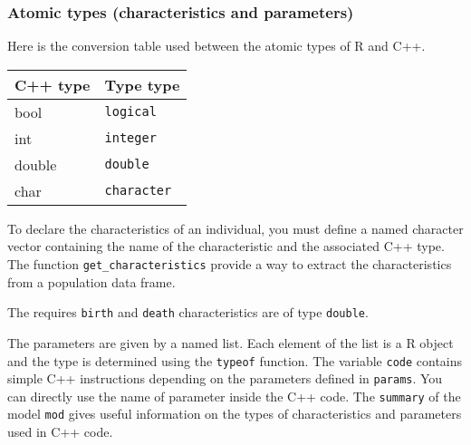 \hypertarget{atomic-types-characteristics-and-parameters}{%
\subsubsection{Atomic types (characteristics and parameters)}\label{atomic-types-characteristics-and-parameters}}

Here is the conversion table used between the atomic types of R and C++.

\begin{longtable}[]{@{}ll@{}}
\toprule
C++ type & Type type\tabularnewline
\midrule
\endhead
bool & \texttt{logical}\tabularnewline
int & \texttt{integer}\tabularnewline
double & \texttt{double}\tabularnewline
char & \texttt{character}\tabularnewline
\bottomrule
\end{longtable}

To declare the characteristics of an individual, you must define a named character vector containing the name of the characteristic and the associated C++ type. The function \texttt{get\_characteristics} provide a way to extract the characteristics from a population data frame.

\begin{Shaded}
\begin{Highlighting}[]
\StringTok{ }\OperatorTok{::}\OperatorTok{$}
\end{Highlighting}
\end{Shaded}

The requires \texttt{birth} and \texttt{death} characteristics are of type \texttt{double}.

The parameters are given by a named list. Each element of the list is a R object and the type is determined using the \texttt{typeof} function. The variable \texttt{code} contains simple C++ instructions depending on the parameters defined in \texttt{params}. You can directly use the name of parameter inside the C++ code. The \texttt{summary} of the model \texttt{mod} gives useful information on the types of characteristics and parameters used in C++ code.


